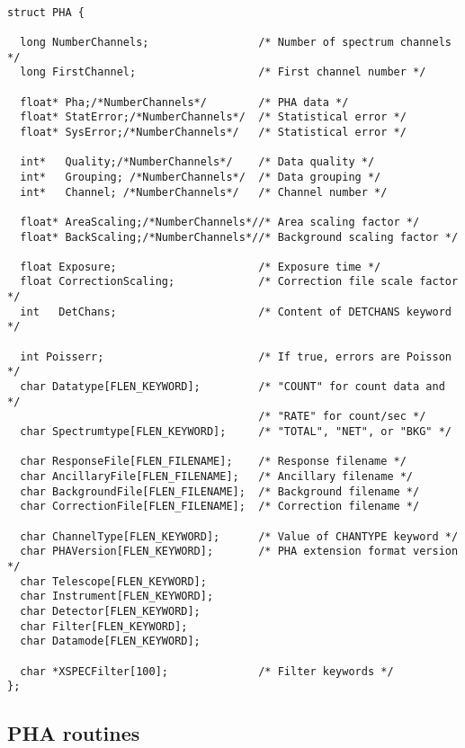 \documentclass[11pt]{book}
\begin{document}
\begin{verbatim}

struct PHA {

  long NumberChannels;                 /* Number of spectrum channels */
  long FirstChannel;                   /* First channel number */

  float* Pha;/*NumberChannels*/        /* PHA data */
  float* StatError;/*NumberChannels*/  /* Statistical error */
  float* SysError;/*NumberChannels*/   /* Statistical error */

  int*   Quality;/*NumberChannels*/    /* Data quality */
  int*   Grouping; /*NumberChannels*/  /* Data grouping */
  int*   Channel; /*NumberChannels*/   /* Channel number */

  float* AreaScaling;/*NumberChannels*//* Area scaling factor */
  float* BackScaling;/*NumberChannels*//* Background scaling factor */

  float Exposure;                      /* Exposure time */
  float CorrectionScaling;             /* Correction file scale factor */
  int   DetChans;                      /* Content of DETCHANS keyword */

  int Poisserr;                        /* If true, errors are Poisson */
  char Datatype[FLEN_KEYWORD];         /* "COUNT" for count data and */
                                       /* "RATE" for count/sec */
  char Spectrumtype[FLEN_KEYWORD];     /* "TOTAL", "NET", or "BKG" */

  char ResponseFile[FLEN_FILENAME];    /* Response filename */
  char AncillaryFile[FLEN_FILENAME];   /* Ancillary filename */
  char BackgroundFile[FLEN_FILENAME];  /* Background filename */
  char CorrectionFile[FLEN_FILENAME];  /* Correction filename */

  char ChannelType[FLEN_KEYWORD];      /* Value of CHANTYPE keyword */
  char PHAVersion[FLEN_KEYWORD];       /* PHA extension format version */
  char Telescope[FLEN_KEYWORD];                             
  char Instrument[FLEN_KEYWORD];
  char Detector[FLEN_KEYWORD];
  char Filter[FLEN_KEYWORD];
  char Datamode[FLEN_KEYWORD];

  char *XSPECFilter[100];              /* Filter keywords */
};

\end{verbatim}

\subsection{PHA routines}
\end{document}
